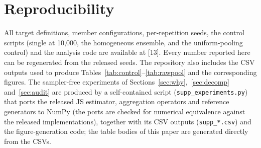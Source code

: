 \documentclass[11pt]{article}
\begin{document}
\section*{Reproducibility}
All target definitions, member configurations, per-repetition seeds, the
control scripts (single at 10{,}000, the homogeneous ensemble, and the
uniform-pooling control) and the analysis code are available at [13]. Every
number reported here can be regenerated from the released seeds. The
repository also includes the CSV outputs used to produce
Tables~\ref{tab:control}--\ref{tab:rawpool} and the corresponding figures.
The sampler-free experiments of Sections~\ref{sec:why},~\ref{sec:decomp}
and~\ref{sec:audit} are produced by a self-contained script
(\texttt{supp\_experiments.py}) that ports the released JS estimator,
aggregation operators and reference generators to NumPy (the ports are checked
for numerical equivalence against the released implementations), together with
its CSV outputs (\texttt{supp\_*.csv}) and the figure-generation code; the
table bodies of this paper are generated directly from the CSVs.
\end{document}
